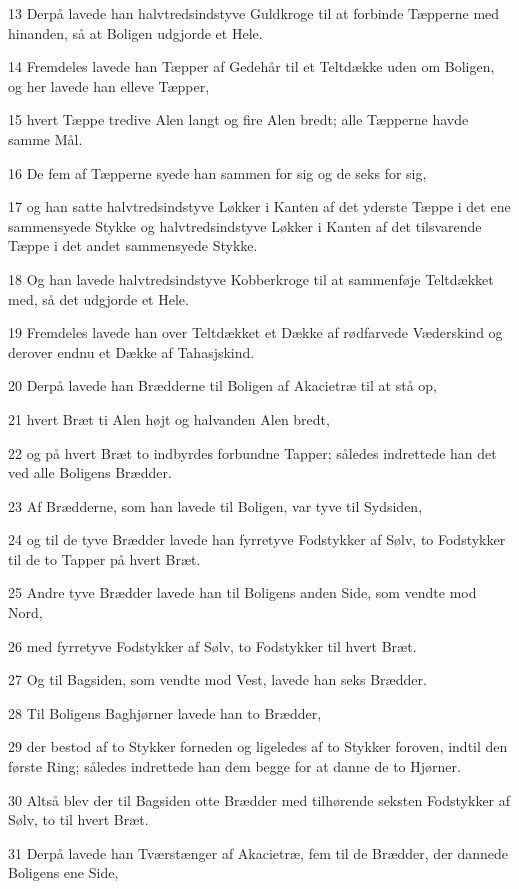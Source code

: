 \par 13 Derpå lavede han halvtredsindstyve Guldkroge til at forbinde Tæpperne med hinanden, så at Boligen udgjorde et Hele.
\par 14 Fremdeles lavede han Tæpper af Gedehår til et Teltdække uden om Boligen, og her lavede han elleve Tæpper,
\par 15 hvert Tæppe tredive Alen langt og fire Alen bredt; alle Tæpperne havde samme Mål.
\par 16 De fem af Tæpperne syede han sammen for sig og de seks for sig,
\par 17 og han satte halvtredsindstyve Løkker i Kanten af det yderste Tæppe i det ene sammensyede Stykke og halvtredsindstyve Løkker i Kanten af det tilsvarende Tæppe i det andet sammensyede Stykke.
\par 18 Og han lavede halvtredsindstyve Kobberkroge til at sammenføje Teltdækket med, så det udgjorde et Hele.
\par 19 Fremdeles lavede han over Teltdækket et Dække af rødfarvede Væderskind og derover endnu et Dække af Tahasjskind.
\par 20 Derpå lavede han Brædderne til Boligen af Akacietræ til at stå op,
\par 21 hvert Bræt ti Alen højt og halvanden Alen bredt,
\par 22 og på hvert Bræt to indbyrdes forbundne Tapper; således indrettede han det ved alle Boligens Brædder.
\par 23 Af Brædderne, som han lavede til Boligen, var tyve til Sydsiden,
\par 24 og til de tyve Brædder lavede han fyrretyve Fodstykker af Sølv, to Fodstykker til de to Tapper på hvert Bræt.
\par 25 Andre tyve Brædder lavede han til Boligens anden Side, som vendte mod Nord,
\par 26 med fyrretyve Fodstykker af Sølv, to Fodstykker til hvert Bræt.
\par 27 Og til Bagsiden, som vendte mod Vest, lavede han seks Brædder.
\par 28 Til Boligens Baghjørner lavede han to Brædder,
\par 29 der bestod af to Stykker forneden og ligeledes af to Stykker foroven, indtil den første Ring; således indrettede han dem begge for at danne de to Hjørner.
\par 30 Altså blev der til Bagsiden otte Brædder med tilhørende seksten Fodstykker af Sølv, to til hvert Bræt.
\par 31 Derpå lavede han Tværstænger af Akacietræ, fem til de Brædder, der dannede Boligens ene Side,
